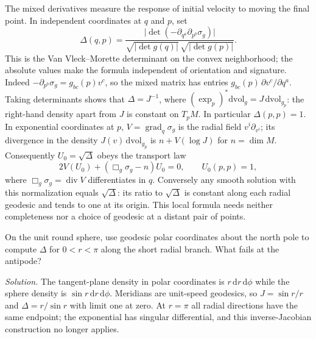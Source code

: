 The mixed derivatives measure the response of initial velocity to moving the final point. In independent coordinates at $q$ and $p$, set
\begin{equation}
 \Delta(q,p)=\frac{\big|\det(-\partial_{q^a}\partial_{p^b}\sigma_g)\big|}
 {\sqrt{|\det g(q)|}\,\sqrt{|\det g(p)|}} .\label{f:van-vleck}
\end{equation}
This is the Van Vleck--Morette determinant on the convex neighborhood; the absolute values make the formula independent of orientation and signature. Indeed $-\partial_{p^b}\sigma_g=g_{bc}(p)v^c$, so the mixed matrix has entries $g_{bc}(p)\,\partial v^c/\partial q^a$. Taking determinants shows that $\Delta=J^{-1}$, where $(\exp_p)^*\mathrm d\mathrm{vol}_g=J\,\mathrm d\mathrm{vol}_{g_p}$: the right-hand density apart from $J$ is constant on $T_pM$. In particular $\Delta(p,p)=1$. In exponential coordinates at $p$, $V=\operatorname{grad}_q\sigma_g$ is the radial field $v^i\partial_{v^i}$; its divergence in the density $J(v)\,\mathrm d\mathrm{vol}_{g_p}$ is $n+V(\log J)$ for $n=\dim M$. Consequently $U_0=\sqrt{\Delta}$ obeys the transport law
\[
 2V(U_0)+(\Box_g\sigma_g-n)U_0=0,\qquad U_0(p,p)=1,
\]
where $\Box_g\sigma_g=\operatorname{div}V$ differentiates in $q$. Conversely any smooth solution with this normalization equals $\sqrt{\Delta}$: its ratio to $\sqrt{\Delta}$ is constant along each radial geodesic and tends to one at its origin. This local formula needs neither completeness nor a choice of geodesic at a distant pair of points.

\begin{exercise}
On the unit round sphere, use geodesic polar coordinates about the north pole to compute $\Delta$ for $0<r<\pi$ along the short radial branch. What fails at the antipode?

\emph{Solution.} The tangent-plane density in polar coordinates is $r\,\mathrm dr\,\mathrm d\phi$ while the sphere density is $\sin r\,\mathrm dr\,\mathrm d\phi$. Meridians are unit-speed geodesics, so $J=\sin r/r$ and $\Delta=r/\sin r$ with limit one at zero. At $r=\pi$ all radial directions have the same endpoint; the exponential has singular differential, and this inverse-Jacobian construction no longer applies.
\end{exercise}
